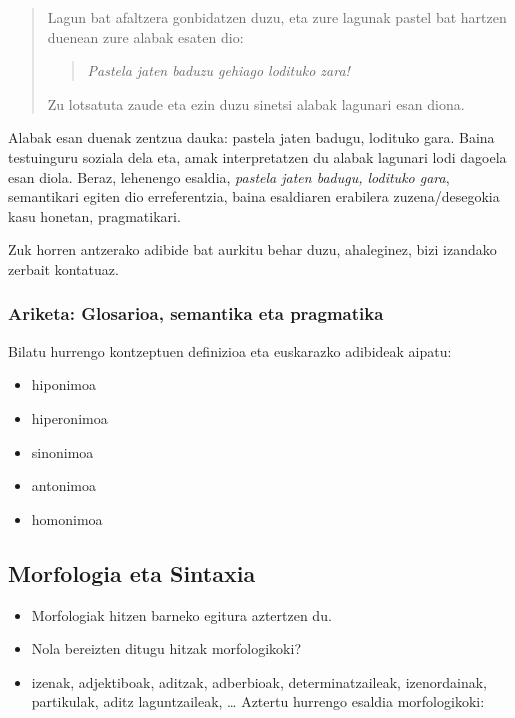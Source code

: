 \documentclass[
]{book}
\providecommand{\tightlist}{%
  \setlength{\itemsep}{0pt}\setlength{\parskip}{0pt}}
\begin{document}
\begin{quote}
Lagun bat afaltzera gonbidatzen duzu, eta zure lagunak pastel bat
hartzen duenean zure alabak esaten dio:

\begin{quote}
\emph{Pastela jaten baduzu gehiago lodituko zara!}
\end{quote}

Zu lotsatuta zaude eta ezin duzu sinetsi alabak lagunari esan diona.
\end{quote}

Alabak esan duenak zentzua dauka: pastela jaten badugu, lodituko gara. Baina testuinguru soziala dela eta, amak interpretatzen du alabak lagunari lodi dagoela esan diola. Beraz, lehenengo esaldia, \emph{pastela jaten badugu, lodituko gara}, semantikari egiten dio erreferentzia, baina esaldiaren erabilera zuzena/desegokia kasu honetan, pragmatikari.

Zuk horren antzerako adibide bat aurkitu behar duzu, ahaleginez, bizi izandako zerbait kontatuaz.

\hypertarget{ariketa-glosarioa-semantika-eta-pragmatika}{%
\subsubsection{Ariketa: Glosarioa, semantika eta pragmatika}\label{ariketa-glosarioa-semantika-eta-pragmatika}}

Bilatu hurrengo kontzeptuen definizioa eta euskarazko adibideak aipatu:

\begin{itemize}
\tightlist
\item
  hiponimoa
\item
  hiperonimoa
\item
  sinonimoa
\item
  antonimoa
\item
  homonimoa
\end{itemize}

\hypertarget{morfologia-eta-sintaxia}{%
\subsection{Morfologia eta Sintaxia}\label{morfologia-eta-sintaxia}}

\begin{itemize}
\tightlist
\item
  Morfologiak hitzen barneko egitura aztertzen du.
\item
  Nola bereizten ditugu hitzak morfologikoki?
\item
  izenak, adjektiboak, aditzak, adberbioak, determinatzaileak, izenordainak,
  partikulak, aditz laguntzaileak, \ldots{}
  Aztertu hurrengo esaldia morfologikoki:
\end{itemize}
\end{document}
